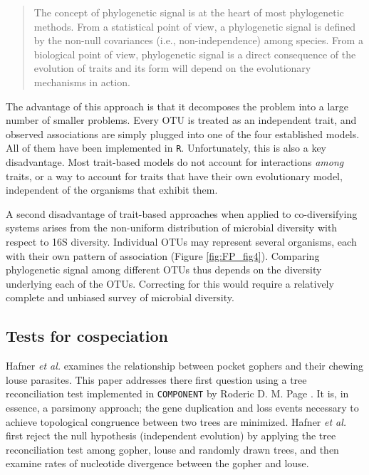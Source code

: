 \begin{quote}
The concept of phylogenetic signal is at the heart of most phylogenetic methods. From a statistical point of view, a phylogenetic signal is defined by the non-null covariances (i.e., non-independence) among species. From a biological point of view, phylogenetic signal is a direct consequence of the evolution of traits and its form will depend on the evolutionary mechanisms in action.
\end{quote}

The advantage of this approach is that it decomposes the problem into a large number of smaller problems. Every OTU is treated as an independent trait, and observed associations are simply plugged into one of the four established models. All of them have been implemented in {\tt R}. Unfortunately, this is also a key disadvantage. Most trait-based models do not account for interactions {\em among} traits, or a way to account for traits that have their own evolutionary model, independent of the organisms that exhibit them. 

A second disadvantage of trait-based approaches when applied to co-diversifying systems arises from the non-uniform distribution of microbial diversity with respect to 16S diversity. Individual OTUs may represent several organisms, each with their own pattern of association (Figure \ref{fig:FP_fig4}). Comparing phylogenetic signal among different OTUs thus depends on the diversity underlying each of the OTUs. Correcting for this would require a relatively complete and unbiased survey of microbial diversity.



\subsection{Tests for cospeciation}

Hafner {\em et al.} \cite{hafner1994disparate} examines the relationship between pocket gophers and their chewing louse parasites. This paper addresses there first question using a tree reconciliation test implemented in {\tt COMPONENT} by Roderic D. M. Page \cite{page1993genes}. It is, in essence, a parsimony approach; the gene duplication and loss events necessary to achieve topological congruence between two trees are minimized. Hafner {\em et al.} first reject the null hypothesis (independent evolution) by applying the tree reconciliation test among gopher, louse and randomly drawn trees, and then examine rates of nucleotide divergence between the gopher and louse. 

